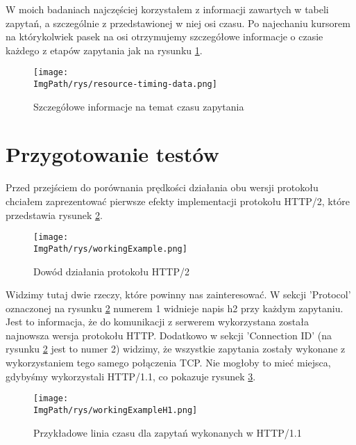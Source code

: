 \documentclass[a4paper,12pt,twoside,openany]{report}
\newcommand{\ImgPath}{.}
\begin{document}
W moich badaniach najczęściej korzystałem z informacji zawartych w tabeli zapytań, a szczególnie z przedstawionej w niej osi czasu.
Po najechaniu kursorem na którykolwiek pasek na osi otrzymujemy szczegółowe informacje o czasie każdego z etapów zapytania jak na rysunku \ref{schematResourceTiming}.

\begin{figure}[!htbp]
	\begin{center}
\centering
\texttt{[image: \\ImgPath/rys/resource-timing-data.png]}
\end{center}
	\caption{Szczegółowe informacje na temat czasu zapytania}
	\label{schematResourceTiming}
\end{figure}

\section{Przygotowanie testów}

Przed przejściem do porównania prędkości działania obu wersji protokołu chciałem zaprezentować pierwsze efekty implementacji protokołu HTTP/2, które przedstawia rysunek \ref{schematWorkingExample}.

\begin{figure}[!htbp]
	\begin{center}
\centering
\texttt{[image: \\ImgPath/rys/workingExample.png]}
\end{center}
	\caption{Dowód działania protokołu HTTP/2}
	\label{schematWorkingExample}
\end{figure}

Widzimy tutaj dwie rzeczy, które powinny nas zainteresować. W sekcji 'Protocol' oznaczonej na rysunku \ref{schematWorkingExample} numerem 1 widnieje napis h2 przy każdym zapytaniu.
Jest to informacja, że do komunikacji z serwerem wykorzystana została najnowsza wersja protokołu HTTP.
Dodatkowo w sekcji 'Connection ID' (na rysunku \ref{schematWorkingExample} jest to numer 2) widzimy, że wszystkie zapytania zostały wykonane z wykorzystaniem tego samego połączenia TCP.
Nie mogłoby to mieć miejsca, gdybyśmy wykorzystali HTTP/1.1, co pokazuje rysunek \ref{schematWorkingExampleH1}.

\begin{figure}[!htbp]
	\begin{center}
\centering
\texttt{[image: \\ImgPath/rys/workingExampleH1.png]}
\end{center}
	\caption{Przykładowe linia czasu dla zapytań wykonanych w HTTP/1.1}
	\label{schematWorkingExampleH1}
\end{figure}
\end{document}
